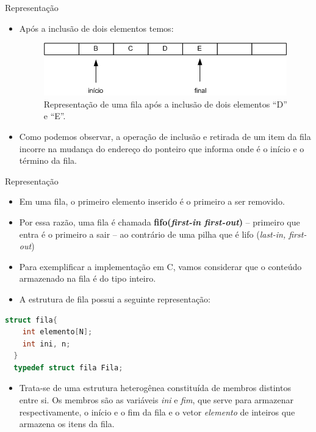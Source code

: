 \begin{frame}{Representação}
\begin{itemize}
	\item Após a inclusão de dois elementos temos:
	\begin{figure}[ht]
				\centering
				\includegraphics[width=.6\textwidth]{figs/fig_filas/exemplo_fila_tres_inclusao.png}
				\caption{Representação de uma fila após a inclusão de dois elementos ``D'' e ``E''.}	
			\end{figure} 
\end{itemize}

\begin{itemize}

	\item Como podemos observar, a operação de inclusão e retirada de um item da fila incorre na mudança do endereço do ponteiro que informa onde é o início e o término da fila.
\end{itemize}

\end{frame}







\begin{frame}[fragile]{Representação}
\begin{itemize}
	\item Em uma fila, o \alert{primeiro} elemento inserido é o primeiro a ser removido.
	\item Por essa razão, uma fila é chamada \textbf{\alert{fifo(\textit{first-in first-out})}} -- primeiro que entra é o primeiro a sair -- ao contrário de uma pilha que é \alert{lifo} (\textit{last-in, first-out})
	\item Para exemplificar a implementação em C, vamos considerar que o conteúdo armazenado na fila é do tipo inteiro.
	\item A estrutura de fila possui a seguinte representação:	
\end{itemize}
\footnotesize
\begin{lstlisting}[language=C]
  struct fila{
    int elemento[N];
    int ini, n;
  }
  typedef struct fila Fila;
\end{lstlisting}

\begin{itemize}
	\item Trata-se de uma estrutura heterogênea constituída de membros distintos entre si.
	 Os membros são as variáveis \alert{\textit{ini}} e \alert{\textit{fim}}, que serve para armazenar respectivamente, o início e o fim da fila e o vetor \alert{\textit{elemento}} 
	 de inteiros que armazena os itens da fila.
\end{itemize}
\end{frame}


